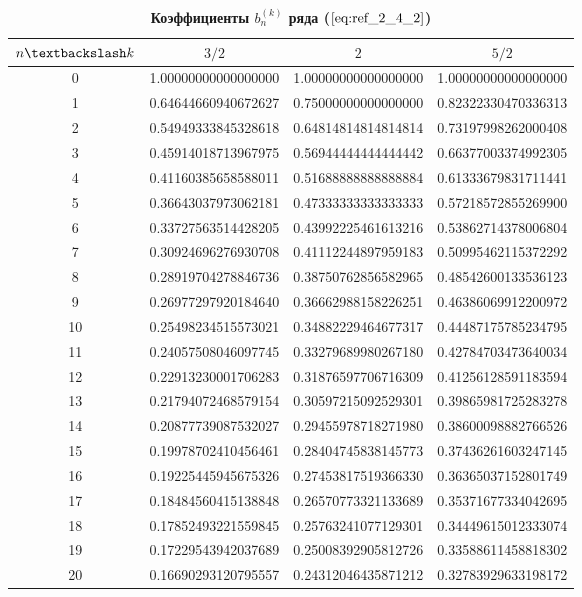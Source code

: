 \begin{table}[]
\caption{\textbf{Коэффициенты $b_n^{(k)}$ ряда ($\ref{eq:ref_2_4_2}$)}}
\begin{center}
\begin{tabular}{|c|c|c|c|}
\hline
$n \textbackslash k$ & $3/2$ & $2$ & $5/2$ \\
\hline
0  & 1.00000000000000000 & 1.00000000000000000 & 1.00000000000000000 \\
1  & 0.64644660940672627 & 0.75000000000000000 & 0.82322330470336313 \\
2  & 0.54949333845328618 & 0.64814814814814814 & 0.73197998262000408 \\
3  & 0.45914018713967975 & 0.56944444444444442 & 0.66377003374992305 \\
4  & 0.41160385658588011 & 0.51688888888888884 & 0.61333679831711441 \\
5  & 0.36643037973062181 & 0.47333333333333333 & 0.57218572855269900 \\
6  & 0.33727563514428205 & 0.43992225461613216 & 0.53862714378006804 \\
7  & 0.30924696276930708 & 0.41112244897959183 & 0.50995462115372292 \\
8  & 0.28919704278846736 & 0.38750762856582965 & 0.48542600133536123 \\
9  & 0.26977297920184640 & 0.36662988158226251 & 0.46386069912200972 \\
10 & 0.25498234515573021 & 0.34882229464677317 & 0.44487175785234795 \\
11 & 0.24057508046097745 & 0.33279689980267180 & 0.42784703473640034 \\
12 & 0.22913230001706283 & 0.31876597706716309 & 0.41256128591183594 \\
13 & 0.21794072468579154 & 0.30597215092529301 & 0.39865981725283278 \\
14 & 0.20877739087532027 & 0.29455978718271980 & 0.38600098882766526 \\
15 & 0.19978702410456461 & 0.28404745838145773 & 0.37436261603247145 \\
16 & 0.19225445945675326 & 0.27453817519366330 & 0.36365037152801749 \\
17 & 0.18484560415138848 & 0.26570773321133689 & 0.35371677334042695 \\
18 & 0.17852493221559845 & 0.25763241077129301 & 0.34449615012333074 \\
19 & 0.17229543942037689 & 0.25008392905812726 & 0.33588611458818302 \\
20 & 0.16690293120795557 & 0.24312046435871212 & 0.32783929633198172 \\

\end{tabular}
\end{center}
\end{table}
